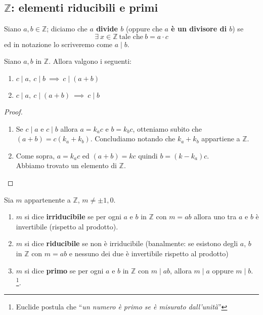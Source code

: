 \subsection{$\mathbb{Z}$: elementi riducibili e primi}
\begin{definizione}[Divisore] Siano $a,b \in \mathbb{Z}$; diciamo che \textbf{$a$ divide $b$} (oppure che \textbf{$a$ è un divisore di $b$}) se 
	\begin{equation*}
	\exists \ x \in \mathbb{Z} \ \text{tale che} \ b = a \cdot c
	\end{equation*}
	ed in notazione lo scriveremo come $a \mid  b$.
\end{definizione}
\begin{proposizione}
	Siano $a,b$ in $\mathbb{Z}$. Allora valgono i seguenti:
	\begin{enumerate}
		\item $c\mid a, \ c\mid b \ \implies \ c\mid (a+b)$
		\item $c\mid a, \ c\mid (a+b) \ \implies \ c\mid b$
	\end{enumerate}
\end{proposizione}
\begin{proof}\ 
\begin{enumerate}
	\item Se $c\mid a$ e $c\mid b$ allora $a=k_a c$ e $b = k_b c$, otteniamo subito che $(a+b)=c(k_a+k_b)$. Concludiamo notando che $k_a+k_b$ appartiene a $\mathbb{Z}$.
	\item Come sopra, $a=k_ac$ ed $(a+b)=kc$ quindi $b=(k-k_a)c$. \\ Abbiamo trovato un elemento di $\mathbb{Z}$.
\end{enumerate}
\end{proof}
\begin{definizione}
	Sia $m$ appartenente a $\mathbb{Z}$, $m \neq \pm 1, 0$.
	\begin{enumerate}
		\item $m$ si dice \textbf{irriducibile} se per ogni $a$ e $b$ in $\mathbb{Z}$ con $m=ab$ allora uno tra $a$ e $b$ è invertibile (rispetto al prodotto).
		\item $m$ si dice \textbf{riducibile} se non è irriducibile (banalmente: se esistono degli $a$, $b$ in $\mathbb{Z}$ con $m=ab$ e nessuno dei due è invertibile rispetto al prodotto)
		\item $m$ si dice \textbf{primo} se per ogni $a$ e $b$ in $\mathbb{Z}$ con $m\mid ab$, allora $m\mid a$ oppure $m\mid b$. \footnote{Euclide postula che \enquote{\textit{un numero è primo se è misurato dall'unità}}}.
	\end{enumerate}
\end{definizione}
